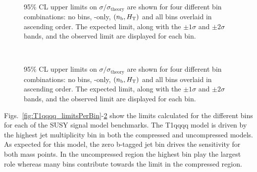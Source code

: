 \begin{figure}[h!]
\begin{center}
{            \label{fig:T2tt_uncomp_limitsPerBin}
        } \\
        \caption{
            95\% CL upper limits on $\sigma/\sigma_{\mathrm{theory}}$ are shown
            for four different bin combinations: no bins, \scalht-only,
            $(n_{\text{b}}, \mbox{$H_\text{T}$})$ and all bins overlaid in ascending order. The
            expected limit, along with the $\pm 1\sigma$ and $\pm 2\sigma$ bands,
            and the observed limit are displayed for each bin.
        }
        \label{fig:T2tt_limitsPerBin}
    \end{center}
\end{figure}

\begin{figure}[h!]
    \begin{center}
         \\
        \caption{
            95\% CL upper limits on $\sigma/\sigma_{\mathrm{theory}}$ are shown
            for four different bin combinations: no bins, \scalht-only,
            $(n_{\text{b}}, \mbox{$H_\text{T}$})$ and all bins overlaid in ascending order. The
            expected limit, along with the $\pm 1\sigma$ and $\pm 2\sigma$ bands,
            and the observed limit are displayed for each bin.
        }
        \label{fig:T2cc_limitsPerBin}
    \end{center}
\end{figure}


Figs.~\ref{fig:T1qqqq_limitsPerBin}-\ref{fig:T2cc_limitsPerBin} show the limits
calculated for the different bins for each of the SUSY signal model benchmarks.
The T1qqqq model is driven by the highest jet multiplicity bin in both the
compressed and uncompressed models. As expected for this model, the zero
b-tagged jet bin drives the sensitivity for both mass points. In the
uncompressed region the highest \scalht bin play the largest role whereas many
\scalht bins contribute towards the limit in the compressed region.

